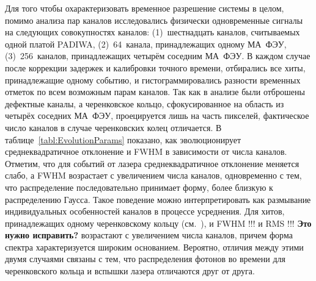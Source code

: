 




Для того чтобы охарактеризовать временное разрешение системы в целом, помимо анализа пар каналов исследовались физически одновременные сигналы на следующих совокупностях каналов: (1)~шестнадцать каналов, считываемых одной платой PADIWA, (2)~64~канала, принадлежащих одному МА~ФЭУ, (3)~256~каналов, принадлежащих четырём соседним МА~ФЭУ. В каждом случае после коррекции задержек и калибровки точного времени, отбирались все хиты, принадлежащие одному событию, и гистограммировались разности временных отметок по всем возможным парам каналов.
Так как в анализе были отброшены дефектные каналы, а черенковское кольцо, сфокусированное на область из четырёх соседних МА~ФЭУ, проецируется лишь на часть пикселей, фактическое число каналов в случае черенковских колец отличается.
В таблице~\ref{tabl:EvolutionParams} показано, как эволюционирует среднеквадратичное отклонение и FWHM в зависимости от числа каналов. Отметим, что для событий от лазера среднеквадратичное отклонение меняется слабо, а FWHM возрастает с увеличением числа каналов, одновременно с тем, что распределение последовательно принимает форму, более близкую к распределению Гаусса. Такое поведение можно интерпретировать как размывание индивидуальных особенностей каналов в процессе усреднения. Для хитов, принадлежащих одному черенковскому кольцу (см.~), и FWHM !!! и RMS !!! \textbf{Это нужно исправить?} возрастают с увеличением числа каналов, причем форма спектра характеризуется широким основанием. Вероятно, отличия между этими двумя случаями связаны с тем, что распределения фотонов во времени для черенковского кольца и вспышки лазера отличаются друг от друга.

